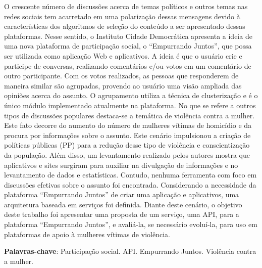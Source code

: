 \begin{resumo}
O crescente número de discussões acerca de temas políticos e outros temas nas redes sociais tem acarretado em uma polarização 
dessas mensagens devido à características dos algoritmos de seleção do conteúdo a ser apresentado dessas plataformas. Nesse sentido, o Instituto Cidade Democrática 
apresenta a ideia de uma nova plataforma de participação social, o ``Empurrando Juntos'', que possa ser utilizada como aplicação Web e aplicativos. A ideia é que o 
usuário crie e participe de conversas, realizando comentários e/ou votos em um comentário de outro participante. Com os votos realizados, as pessoas que 
responderem de maneira similar são agrupadas, provendo ao usuário uma visão ampliada das opiniões acerca do assunto. O agrupamento utiliza a técnica de 
clusterização e é o único módulo implementado atualmente na plataforma. No que se refere a outros tipos de discussões populares  destaca-se a temática de violência 
contra a mulher. Este fato decorre do aumento do número de mulheres vítimas de homicídio e da procura por informações sobre o assunto. Este cenário impulsionou a 
criação de políticas públicas (PP) para a redução desse tipo de violência e conscientização da população. Além disso, um levantamento realizado pelos autores 
mostra que aplicativos e sites surgiram para auxiliar na divulgação de informações e no levantamento de dados e estatísticas. Contudo, nenhuma ferramenta com foco 
em discussões efetivas sobre o assunto foi encontrada. Considerando a necessidade da plataforma ``Empurrando Juntos'' de criar uma aplicação e aplicativos, uma 
arquitetura baseada em serviços foi definida. Diante deste cenário, o objetivo deste trabalho foi apresentar uma proposta de um serviço, uma API, para a plataforma 
``Empurrando Juntos'', e avaliá-la, se necessário evoluí-la, para uso em plataformas de apoio à mulheres vítimas de violência. 
\vspace{\onelineskip}
  
\noindent
\textbf{Palavras-chave}: Participação social. API. Empurrando Juntos. Violência contra a mulher.
\end{resumo}

